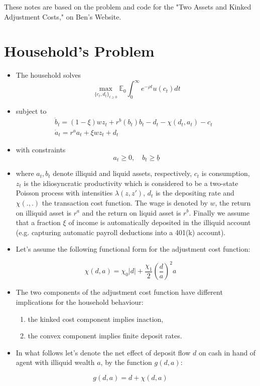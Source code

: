 \documentclass[11pt]{article}
\author{Soroush}
\date{\today}
\title{}
\begin{document}
\tableofcontents

\newpage
These notes are based on the problem and code for the "Two Assets and Kinked Adjustment Costs," on Ben's Website.

\section{Household's Problem}
\label{sec:orgfa13185}
\begin{itemize}
\item The household solves \[\operatorname*{max}_{\{c_t,d_{t}\}_{t\ge 0}} \mathbb{E}_0 \int_{0}^{\infty}e^{-\rho t}u(c_{t})d t\]
\item subject to \[\begin{array}{l} {\displaystyle{\dot{b}}_{t}=(1-\xi)w z_{t}+r^{b}(b_{t})b_{t}-d_{t}-\chi(d_{t},a_{t})-c_{t}}\\ {{\displaystyle{\dot{a}}_{t}=r^{a}a_{t}+\xi w z_{t}+d_{t}}}&{{}}\end{array}\]
\item with constraints \[a_{t}\geq0,\quad b_{t}\geq\underline{{{b}}}\]
\item where \(a_t, b_t\) denote illiquid and liquid assets, respectively, \(c_t\) is consumption, \(z_t\) is the idiosyncratic productivity which is considered to be a two-state Poisson process with intensities \(\lambda(z,z')\), \(d_t\) is the depositing rate and \(\chi(.,.)\) the transaction cost function. The wage is denoted by \(w\), the return on illiquid asset is \(r^a\) and the return on liquid asset is \(r^b\). Finally we assume that a fraction \(\xi\) of income is automatically deposited in the illiquid account (e.g. capturing automatic payroll deductions into a 401(k) account).
\item Let's assume the following functional form for the adjustment cost function:
\end{itemize}
\begin{equation}
\label{eq:1}
\chi(d,a)=\chi_{0}|d|+\frac{\chi_{1}}{2}\left(\frac{d}{a}\right)^{2}a
\end{equation}
\begin{itemize}
\item The two components of the adjustment cost function have different implications for the household behaviour:
\begin{enumerate}
\item the kinked cost component implies inaction,
\item the convex component implies finite deposit rates.
\end{enumerate}
\item In what follows let's denote the net effect of deposit flow \(d\) on cash in hand of agent with illiquid wealth \(a\), by the function \(g(d,a)\):
\end{itemize}
\[g(d,a) = d + \chi(d,a) \]
\end{document}
